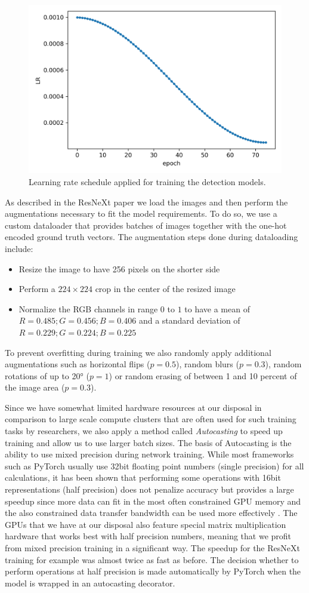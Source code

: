 \begin{figure}[h!]
	\centering
	\includegraphics[width=.6\linewidth]{img/LR.png}
	\caption{Learning rate schedule applied for training the detection models.}
	\label{fig:lr_schedule}
\end{figure}

As described in the ResNeXt paper we load the images and then perform the augmentations necessary to fit the model requirements. To do so, we use a custom dataloader that provides batches of images together with the one-hot encoded ground truth vectors. The augmentation steps done during dataloading include:

\begin{itemize}
	\item Resize the image to have 256 pixels on the shorter side
	\item Perform a $224 \times 224$ crop in the center of the resized image
	\item Normalize the RGB channels in range $0$ to $1$ to have a mean of $R=0.485; G=0.456; B=0.406$ and a standard deviation of $R=0.229; G=0.224; B=0.225$
\end{itemize}

To prevent overfitting during training we also randomly apply additional augmentations such as horizontal flips ($p=0.5$), random blurs ($p=0.3$), random rotations of up to 20° ($p=1$) or random erasing of between 1 and 10 percent of the image area ($p=0.3$).

Since we have somewhat limited hardware resources at our disposal in comparison to large scale compute clusters that are often used for such training tasks by researchers, we also apply a method called \textit{Autocasting} to speed up training and allow us to use larger batch sizes. The basis of Autocasting is the ability to use mixed precision during network training. While most frameworks such as PyTorch usually use 32bit floating point numbers (single precision) for all calculations, it has been shown that performing some operations with 16bit representations (half precision) does not penalize accuracy but provides a large speedup since more data can fit in the most often constrained GPU memory and the also constrained data transfer bandwidth can be used more effectively \autocite{micikevicius_mixed_2018}. The GPUs that we have at our disposal also feature special matrix multiplication hardware that works best with half precision numbers, meaning that we profit from mixed precision training in a significant way. The speedup for the ResNeXt training for example was almost twice as fast as before. The decision whether to perform operations at half precision is made automatically by PyTorch when the model is wrapped in an autocasting decorator.

